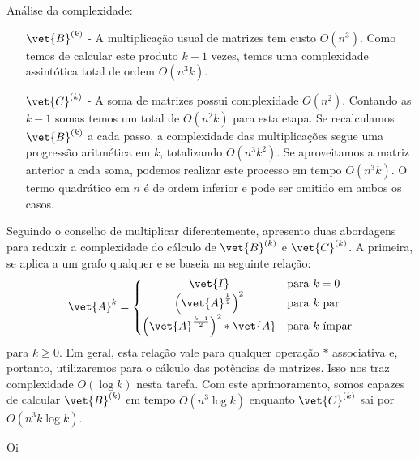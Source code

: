 \documentclass[l15]{homework}
\begin{document}
	\subsubquest%
	Análise da complexidade:
	\begin{itemize}
		\item [$\vet{B}^{(k)}$ -] A multiplicação usual de matrizes tem custo $O(n^3)$. Como temos de calcular este produto $k - 1$ vezes, temos uma complexidade assintótica total de ordem $O(n^3 k)$.
		
		\item [$\vet{C}^{(k)}$ -] A soma de matrizes possui complexidade $O(n^2)$. Contando as $k - 1$ somas temos um total de $O(n^2 k)$ para esta etapa. Se recalculamos $\vet{B}^{(k)}$ a cada passo, a complexidade das multiplicações segue uma progressão aritmética em $k$, totalizando $O(n^3 k^2)$. Se aproveitamos a matriz anterior a cada soma, podemos realizar este processo em tempo  $O(n^3 k)$. O termo quadrático em $n$ é de ordem inferior e pode ser omitido em ambos os casos.
	\end{itemize}
	
	\subsubquest%
	Seguindo o conselho de multiplicar diferentemente, apresento duas abordagens para reduzir a complexidade do cálculo de $\vet{B}^{(k)}$ e $\vet{C}^{(k)}$. A primeira, se aplica a um grafo qualquer e se baseia na seguinte relação:
	$$\vet{A}^k = \left\{\begin{array}{@{}cl@{}}
		\vet{I} &\text{para } k = 0\\
		\left(\vet{A}^{\frac{k}{2}}\right)^2 &\text{para } k \text{ par}\\
		\left(\vet{A}^{\frac{k - 1}{2}}\right)^2 \ast \vet{A} &\text{para } k \text{ ímpar}
		\end{array}\right.$$
	para $k \ge 0$. Em geral, esta relação vale para qualquer operação $\ast$ associativa e, portanto, utilizaremos para o cálculo das potências de matrizes. Isso nos traz complexidade $O(\log k)$ nesta tarefa. Com este aprimoramento, somos capazes de calcular $\vet{B}^{(k)}$ em tempo $O(n^3 \log k)$ enquanto $\vet{C}^{(k)}$ sai por $O(n^3 k \log k)$.

	\quest*{}
	Oi
\end{document}
